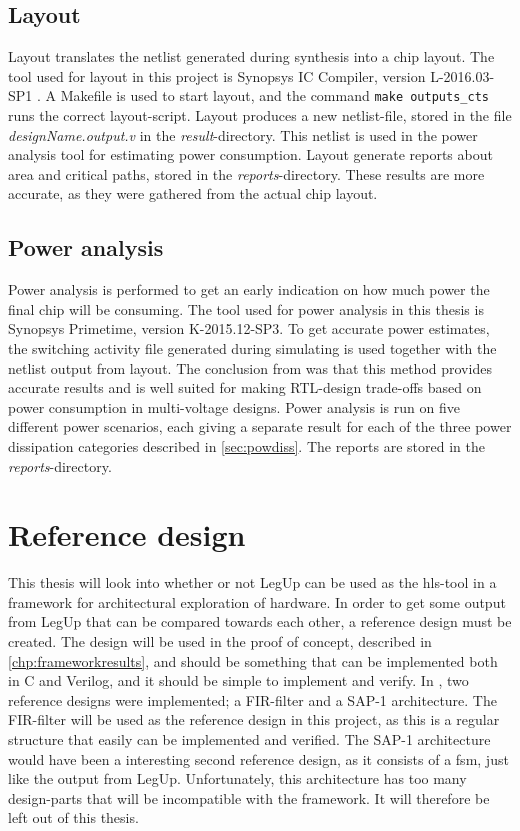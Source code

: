\subsection{Layout}
Layout translates the netlist generated during synthesis into a chip layout. The tool used for layout in this project is Synopsys IC Compiler, version L-2016.03-SP1 \cite{syniccomp}. A Makefile is used to start layout, and the command \verb!make outputs_cts! runs the correct layout-script. Layout produces a new netlist-file, stored in the file \textit{designName.output.v} in the \textit{result}-directory. This netlist is used in the power analysis tool for estimating power consumption. Layout generate reports about area and critical paths, stored in the \textit{reports}-directory. These results are more accurate, as they were gathered from the actual chip layout.
\subsection{\label{sec:powest}Power analysis}
Power analysis is performed to get an early indication on how much power the final chip will be consuming. The tool used for power analysis in this thesis is Synopsys Primetime, version K-2015.12-SP3. To get accurate power estimates, the switching activity file generated during simulating is used together with the netlist output from layout. The conclusion from \cite{talstad15master} was that this method provides accurate results and is well suited for making RTL-design trade-offs based on power consumption in multi-voltage designs. Power analysis is run on five different power scenarios, each giving a separate result for each of the three power dissipation categories described in \cref{sec:powdiss}. The reports are stored in the \textit{reports}-directory.

\section{Reference design}
\label{sec:refdes}
This thesis will look into whether or not LegUp can be used as the \gls{hls}-tool in a framework for architectural exploration of hardware. In order to get some output from LegUp that can be compared towards each other, a reference design must be created. The design will be used in the proof of concept, described in \cref{chp:frameworkresults}, and should be something that can be implemented both in C and Verilog, and it should be simple to implement and verify. In \cite{holm2015pro}, two reference designs were implemented; a FIR-filter and a SAP-1 architecture. The FIR-filter will be used as the reference design in this project, as this is a regular structure that easily can be implemented and verified. The SAP-1 architecture would have been a interesting second reference design, as it consists of a \gls{fsm}, just like the output from LegUp. Unfortunately, this architecture has too many design-parts that will be incompatible with the framework. It will therefore be left out of this thesis.

